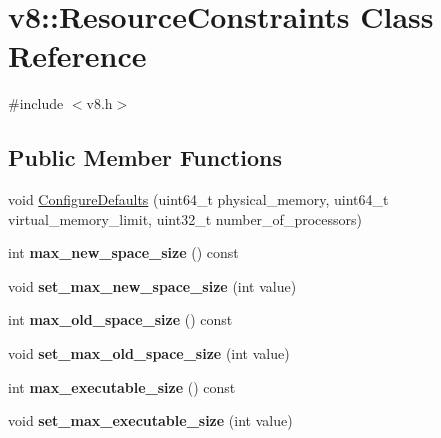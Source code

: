 \hypertarget{classv8_1_1_resource_constraints}{}\section{v8\+:\+:Resource\+Constraints Class Reference}
\label{classv8_1_1_resource_constraints}


{\ttfamily \#include $<$v8.\+h$>$}

\subsection*{Public Member Functions}
\begin{DoxyCompactItemize}
\item 
void \hyperlink{classv8_1_1_resource_constraints_a6e5d38fd99d89d4fc10e325507d08d52}{Configure\+Defaults} (uint64\+\_\+t physical\+\_\+memory, uint64\+\_\+t virtual\+\_\+memory\+\_\+limit, uint32\+\_\+t number\+\_\+of\+\_\+processors)
\item 
\hypertarget{classv8_1_1_resource_constraints_a5c8f7c1c07216d5bf374bfaacad25b6c}{}int {\bfseries max\+\_\+new\+\_\+space\+\_\+size} () const \label{classv8_1_1_resource_constraints_a5c8f7c1c07216d5bf374bfaacad25b6c}

\item 
\hypertarget{classv8_1_1_resource_constraints_af4d372fa73974d8cb5f9ee60de3ef549}{}void {\bfseries set\+\_\+max\+\_\+new\+\_\+space\+\_\+size} (int value)\label{classv8_1_1_resource_constraints_af4d372fa73974d8cb5f9ee60de3ef549}

\item 
\hypertarget{classv8_1_1_resource_constraints_a72840efdbcfc7bb287c6aea38d0b07b9}{}int {\bfseries max\+\_\+old\+\_\+space\+\_\+size} () const \label{classv8_1_1_resource_constraints_a72840efdbcfc7bb287c6aea38d0b07b9}

\item 
\hypertarget{classv8_1_1_resource_constraints_aa764be7c76b4baa3fce7a54c3777b5e9}{}void {\bfseries set\+\_\+max\+\_\+old\+\_\+space\+\_\+size} (int value)\label{classv8_1_1_resource_constraints_aa764be7c76b4baa3fce7a54c3777b5e9}

\item 
\hypertarget{classv8_1_1_resource_constraints_a037777e608ed1c22fe294ecef5722036}{}int {\bfseries max\+\_\+executable\+\_\+size} () const \label{classv8_1_1_resource_constraints_a037777e608ed1c22fe294ecef5722036}

\item 
\hypertarget{classv8_1_1_resource_constraints_a37d1b38672e9844c567823a119dcd557}{}void {\bfseries set\+\_\+max\+\_\+executable\+\_\+size} (int value)\label{classv8_1_1_resource_constraints_a37d1b38672e9844c567823a119dcd557}


\end{DoxyCompactItemize}
